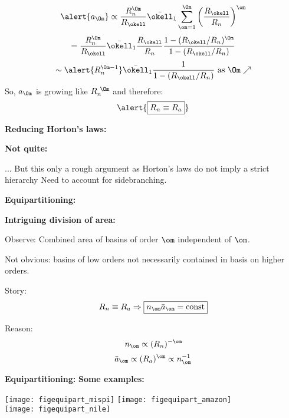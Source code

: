\begin{frame}[label=]
\begin{frame}[label=]
\begin{frame}[label=]
\begin{frame}[label=]
\begin{frame}[label=]
\begin{frame}[label=]
\begin{frame}[label=]
\begin{frame}[label=]
\begin{frame}[label=]
\begin{frame}[label=]
\begin{frame}[label=]
\begin{frame}[label=]
\begin{frame}[label=]
\begin{frame}[label=]
\begin{frame}[label=]
\begin{frame}[label=]
\begin{frame}[label=]
    
      $$
      \alert{a_\Om} \propto \frac{R_n^\Om}{R_\okell} \bar{\okell}_1
      \sum_{\om=1}^{\Om} 
       \left(
         \frac{R_\okell}{R_n}
       \right)^\om
      $$
      {
        $$
        =
        \frac{R_n^\Om}{R_\okell}
        \bar{\okell}_1
        \frac{R_\okell}{R_n}
        \frac
        {1-(R_\okell/R_n)^\Om}
        {1-(R_\okell/R_n)}
        $$
      }
      {
        $$
        \sim
        \alert{R_n^{\Om-1}}
        \bar{\okell}_1
        \frac
        {1}
        {1-(R_\okell/R_n)}
        \mbox{\ as $\Om \nearrow$}
        $$
      }
    {
        So, $a_\Om$ is growing like $R_n^{\ \Om}$ and therefore:
        $$
        \alert{\boxed{R_n \equiv R_a}}
        $$
      }
    
  


\begin{frame}[label=]
  \textbf{Reducing Horton's laws:}

  \textbf{Not quite:}
    
     ... But this only a rough argument
      as Horton's laws do not imply a strict hierarchy
     Need to account for sidebranching.
     
    
  


\begin{frame}[label=]
  \textbf{Equipartitioning:}

  \textbf{Intriguing division of area:}
  
  
    Observe: Combined area of basins of order $\om$ 
    independent of $\om$.
  
    Not obvious: basins of low orders not necessarily contained
    in basis on higher orders.
  
    Story: $$ {R_n \equiv R_a} 
    \Rightarrow \boxed{n_\om \bar{a}_\om = \mbox{const}} $$
  
    Reason:
    $$ n_\om \propto (R_n)^{-\om} $$
    $$ \bar{a}_\om \propto (R_a)^{\om} \propto n_\om^{-1}$$
  
  


\begin{frame}[label=]
  \textbf{Equipartitioning:}
  \textbf{Some examples:}
    \begin{center}
      \texttt{[image: figequipart\_mispi]}
      \texttt{[image: figequipart\_amazon]} \\
      \texttt{[image: figequipart\_nile]}
    \end{center}
  




\end{frame}
\end{frame}
\end{frame}
\end{frame}
\end{frame}
\end{frame}
\end{frame}
\end{frame}
\end{frame}
\end{frame}
\end{frame}
\end{frame}
\end{frame}
\end{frame}
\end{frame}
\end{frame}
\end{frame}
\end{frame}
\end{frame}
\end{frame}
